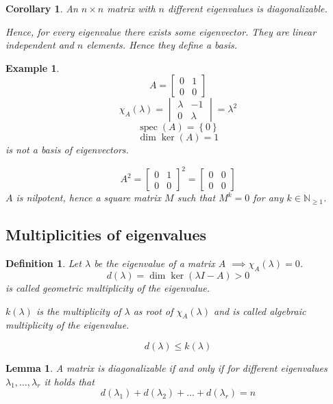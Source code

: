 \documentclass{article}
\newtheorem{example}{Example}  \numberwithin{example}{section}
\newtheorem{definition}{Definition}  \numberwithin{definition}{section}
\newtheorem{lemma}{Lemma}  \numberwithin{lemma}{section}
\newtheorem{corollary}{Corollary}  \numberwithin{corollary}{section}
\newcommand{\set}[1]{\left\{#1\right\}}
\begin{document}
\begin{corollary} %
  An $n\times n$ matrix with $n$ different eigenvalues is diagonalizable.

  Hence, for every eigenvalue there exists some eigenvector. They are linear independent and $n$ elements.
  Hence they define a basis.
\end{corollary}

\begin{example} %
  \[ A = \begin{bmatrix} 0 & 1 \\ 0 & 0 \end{bmatrix} \]
  \[ \chi_A(\lambda) = \begin{vmatrix} \lambda & -1 \\ 0 & \lambda \end{vmatrix} = \lambda^2 \]
  \[ \operatorname{spec}(A) = \set{0} \]
  \[ \dim\ker(A) = 1 \]
  is not a basis of eigenvectors.

  \[ A^2 = \begin{bmatrix} 0 & 1 \\ 0 & 0 \end{bmatrix}^2 = \begin{bmatrix} 0 & 0 \\ 0 & 0 \end{bmatrix} \]
  $A$ is nilpotent, hence a square matrix $M$ such that $M^k = 0$ for any $k \in \mathbb N_{\geq1}$.
\end{example}

\subsection{Multiplicities of eigenvalues}

\begin{definition} %
  Let $\lambda$ be the eigenvalue of a matrix $A$ $\implies \chi_A(\lambda) = 0$.
  \[ d(\lambda) = \dim\ker(\lambda I - A) > 0 \]
  is called \emph{geometric multiplicity of the eigenvalue}.

  $k(\lambda)$ is the multiplicity of $\lambda$ as root of $\chi_A(\lambda)$
  and is called \emph{algebraic multiplicity of the eigenvalue}.

  \[ d(\lambda) \leq k(\lambda) \]
\end{definition}

\begin{lemma} %
  A matrix is diagonalizable if and only if for different eigenvalues $\lambda_1, \dots, \lambda_r$ it holds that
  \[ d(\lambda_1) + d(\lambda_2) + \dots + d(\lambda_r) = n \]
\end{lemma}
\end{document}
